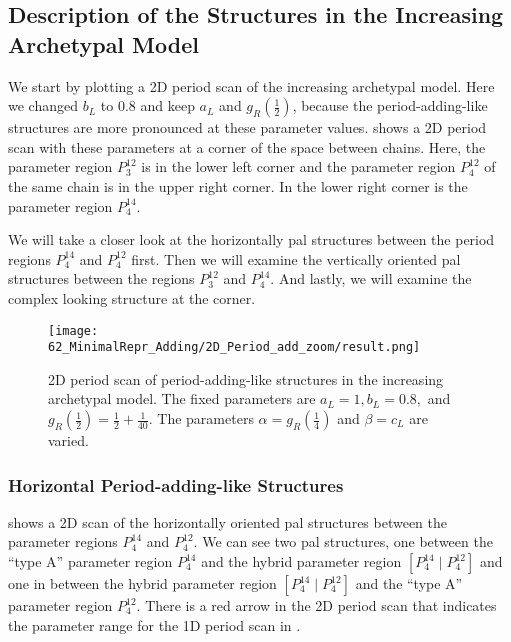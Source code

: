 \subsection{Description of the Structures in the Increasing Archetypal Model}
\label{sec:add.add.like}

We start by plotting a 2D period scan of the increasing archetypal model.
Here we changed $b_L$ to $0.8$ and keep $a_L$ and $g_R\left(\frac{1}{2}\right)$, because the period-adding-like structures are more pronounced at these parameter values.
 shows a 2D period scan with these parameters at a corner of the space between chains.
Here, the parameter region $P^{12}_3$ is in the lower left corner and the parameter region $P^{12}_4$ of the same chain is in the upper right corner.
In the lower right corner is the parameter region $P^{14}_4$.

We will take a closer look at the horizontally \gls{pal} structures between the period regions $P^{14}_4$ and $P^{12}_4$ first.
Then we will examine the vertically oriented \gls{pal} structures between the regions $P^{12}_3$ and $P^{14}_4$.
And lastly, we will examine the complex looking structure at the corner.

\begin{figure}
	\centering
	\texttt{[image: 62\_MinimalRepr\_Adding/2D\_Period\_add\_zoom/result.png]}
	\caption[2D period scan of period-adding-like structures in the increasing archetypal model]{
		2D period scan of period-adding-like structures in the increasing archetypal model.
		The fixed parameters are $a_L = 1, b_L = 0.8,$ and $g_R\left(\frac{1}{2}\right) = \frac{1}{2} + \frac{1}{40}$.
		The parameters $\alpha = g_R\left(\frac{1}{4}\right)$ and $\beta = c_L$ are varied.
	}
	\label{fig:add.add.like}
\end{figure}

\subsubsection{Horizontal Period-adding-like Structures}

 shows a 2D scan of the horizontally oriented \gls{pal} structures between the parameter regions $P^{14}_4$ and $P^{12}_4$.
We can see two \gls{pal} structures, one between the ``type A'' parameter region $P^{14}_4$ and the hybrid parameter region $\left[P^{14}_4 \mid P^{12}_4\right]$ and one in between the hybrid parameter region $\left[P^{14}_4 \mid P^{12}_4\right]$ and the ``type A'' parameter region $P^{12}_4$.
There is a red arrow in the 2D period scan that indicates the parameter range for the 1D period scan in .

